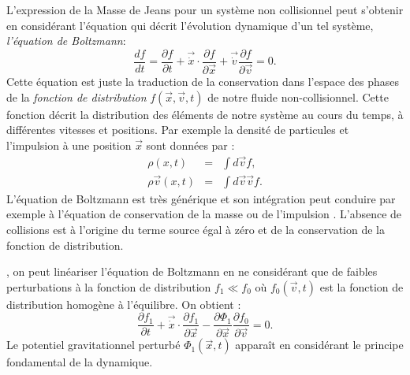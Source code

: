 L'expression de la Masse de Jeans pour un système non collisionnel peut s'obtenir en considérant l'équation qui décrit l'évolution dynamique d'un tel système, \textit{l'équation de Boltzmann}:
\begin{equation}
\frac{d f}{dt}=\frac{\partial f}{\partial t}+\vec{\dot x}\cdot\frac{\partial f}{\partial \vec{x}}+\vec{\dot v}\frac{\partial f}{\partial \vec{v}}=0.
\end{equation}
Cette équation est juste la traduction de la conservation dans l'espace des phases de la \textit{fonction de distribution} $f(\vec{x},\vec{v},t)$ de notre fluide non-collisionnel. Cette fonction décrit la distribution des éléments de notre système au cours du temps, à différentes vitesses et positions. Par exemple la densité de particules  et l'impulsion à une position $\vec{x}$ sont données par :
\begin{eqnarray}
\rho(x,t)&=&\int d\vec{v} f,\\
\rho \vec{v}(x,t)&=&\int d\vec{v}\vec{v} f.
\end{eqnarray}
L'équation de Boltzmann est très générique et son intégration peut conduire par exemple à l'équation de conservation de la masse ou de l'impulsion . L'absence de collisions est à l'origine du terme source égal à zéro et de la conservation de la fonction de distribution.

, on peut linéariser l'équation de Boltzmann en ne considérant que de faibles perturbations à la fonction de distribution $f_1\ll f_0$ où $f_0(\vec{v},t)$ est la fonction de distribution homogène à l'équilibre. On obtient :
\begin{equation}
\frac{\partial f_1}{\partial t}+\vec{\dot x}\cdot\frac{\partial f_1}{\partial \vec{x}}-\frac{\partial \Phi_1}{\partial \vec{x}}\frac{\partial f_0}{\partial \vec{v}}=0.
\end{equation}
Le potentiel gravitationnel perturbé $\Phi_1(\vec{x},t)$ apparaît en considérant le principe fondamental de la dynamique.

